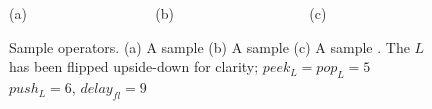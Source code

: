 \begin{figure}
\begin{center}

\begin{minipage}{0.7in}
\centering {}
\end{minipage}
~
\begin{minipage}{0.8in}
\centering {}
\end{minipage}
~
\begin{minipage}{0.8in}
\centering {}
\end{minipage}

\vspace{0.1in}

\begin{minipage}{2in}
\small (a) ~~~~~~~~~~~~~~~~~ (b) ~~~~~~~~~~~~~~~~~~ (c)
\end{minipage}

\caption{\small Sample {\StreamIt} operators. (a) A sample
{\pipeline} (b) A sample {\splitjoin} (c) A sample
{\feedbackloop}.  The $L$ {\filter} has been flipped upside-down
for clarity; $peek_L = pop_L = 5$ $push_L = 6$, $delay_{fl} = 9$}
\label{fig:steady-state}
\end{center}
\end{figure}

